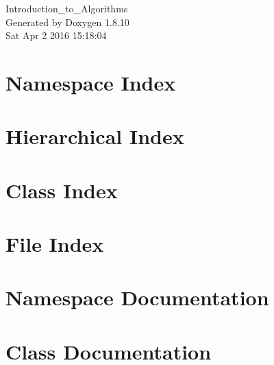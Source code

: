 \documentclass[twoside]{book}
\newcommand{\+}{\discretionary{\mbox{\scriptsize$\hookleftarrow$}}{}{}}
\newcommand{\clearemptydoublepage}{%
  \newpage{\pagestyle{empty}\cleardoublepage}%
}
\begin{document}
\hypersetup{pageanchor=false,
             bookmarks=true,
             bookmarksnumbered=true,
             pdfencoding=unicode
            }
\begin{titlepage}
\vspace*{7cm}
\begin{center}%
{\Large Introduction\+\_\+to\+\_\+\+Algorithms }\\
\vspace*{1cm}
{\large Generated by Doxygen 1.8.10}\\
\vspace*{0.5cm}
{\small Sat Apr 2 2016 15:18:04}\\
\end{center}
\end{titlepage}
\clearemptydoublepage
\tableofcontents
\clearemptydoublepage
{}
\hypersetup{pageanchor=true}

\chapter{Namespace Index}

\chapter{Hierarchical Index}

\chapter{Class Index}

\chapter{File Index}

\chapter{Namespace Documentation}






\chapter{Class Documentation}














\end{document}
